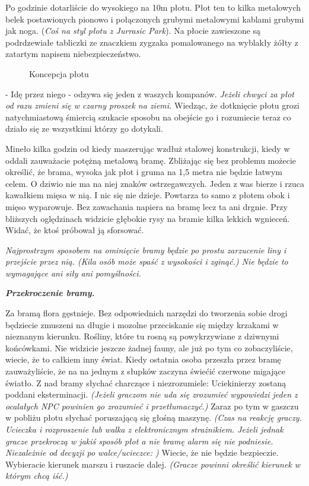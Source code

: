 \documentclass{article}
\begin{document}
    \normalfont
    Po godzinie dotarliście do wysokiego na 10m płotu. Płot ten to kilka metalowych belek postawionych pionowo i połączonych grubymi metalowymi kablami grubymi jak noga. (\emph{Coś na styl płotu z Jurrasic Park}). Na płocie zawieszone są podrdzewiałe tabliczki ze znaczkiem zygzaka pomalowanego na wyblakły żółty z zatartym napisem niebezpieczeństwo. 

    \begin{figure}
        \centering
        \def\svgwidth{\columnwidth}
        
        \caption{Koncepcja płotu}
    \end{figure}

    - Idę przez niego - odzywa się jeden z waszych kompanów. \emph{Jeżeli chwyci za płot od razu zmieni się w czarny proszek na ziemi.} Wiedząc, że dotknięcie płotu grozi natychmiastową śmiercią szukacie sposobu na obejście go i rozumiecie teraz co działo się ze wszystkimi którzy go dotykali.



    Mineło kilka godzin od kiedy maszerując wzdłuż stalowej konstrukcji, kiedy w oddali zauważacie potężną metalową bramę. Zbliżając się bez problemu możecie określić, że brama, wysoka jak płot i gruma na 1,5 metra nie będzie łatwym celem. O dziwio nie ma na niej znaków ostrzegawczych. Jeden z was bierze i rzuca kawałkiem mięsa w nią. I nic się nie dzieje. Powtarza to samo z płotem obok i mięso wyparowuje. Bez zawachania napiera na bramę lecz ta ani drgnie. Przy bliższych oględzinach widzicie głębokie rysy na bramie kilka lekkich wgnieceń. Widać, że ktoś próbował ją sforsować.

    \bigskip
    \slshape
    Najprostrzym sposobem na ominięcie bramy będzie po prostu zarzucenie liny i przejście przez nią. (Kila osób może spaść z wysokości i zginąć.) Nie będzie to wymagające ani siły ani pomyślności.

    \bigskip
    \normalfont
    \emph{\textbf{Przekroczenie bramy.}}

    Za bramą flora gęstnieje. Bez odpowiednich narzędzi do tworzenia sobie drogi będziecie zmuszeni na długie i mozolne przeciskanie się między krzakami w nieznanym kierunku. Rośliny, które tu rosną są powykrzywiane z dziwnymi końcówkami. Nie widzicie jeszcze żadnej fauny, ale już po tym co zobaczyliście, wiecie, że to całkiem inny świat. Kiedy ostatnia osoba przeszła przez bramę zauważyliście, że na na jednym z słupków zaczyna świećić czerwone migające światło. Z nad bramy słychać charczące i niezrozumiele: Uciekinierzy zostaną poddani eksterminacji. \emph{(Jeżeli graczom nie uda się zrozumieć wypowiedzi jeden z ocalałych NPC powinien go zrozumieć i przetłumaczyć.)} Zaraz po tym w gaszczu w pobliżu płotu słychać poruszającą się głośną maszynę. \emph{(Czas na reakcję graczy. Ucieczka i rozproszenie lub walka z elektronicznym strażnikiem. Jeżeli jednak gracze przekroczą w jakiś sposób płot a nie bramę alarm się nie podniesie. Niezależnie od decyzji po walce/ucieczce: )} Wiecie, że nie będzie bezpieczie. Wybieracie kierunek marszu i ruszacie dalej. \emph{(Gracze powinni określić kierunek w którym chcą iść.)}
\end{document}
